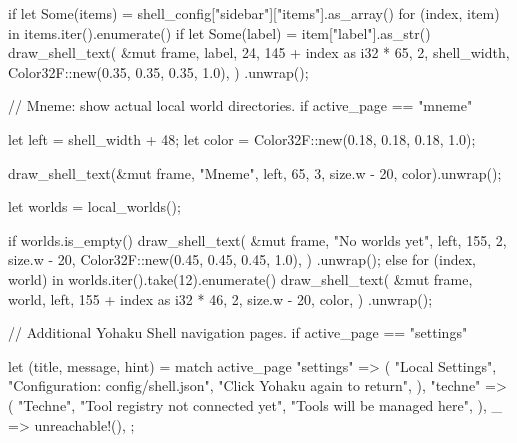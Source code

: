 {{{{                if let Some(items) = shell_config["sidebar"]["items"].as_array() {
                    for (index, item) in items.iter().enumerate() {
                        if let Some(label) = item["label"].as_str() {
                            draw_shell_text(
                                &mut frame,
                                label,
                                24,
                                145 + index as i32 * 65,
                                2,
                                shell_width,
                                Color32F::new(0.35, 0.35, 0.35, 1.0),
                            )
                            .unwrap();
                        }
                    }
                }
            }

            // Mneme: show actual local world directories.
            if active_page == "mneme" {
                let left = shell_width + 48;
                let color = Color32F::new(0.18, 0.18, 0.18, 1.0);

                draw_shell_text(&mut frame, "Mneme", left, 65, 3, size.w - 20, color).unwrap();

                let worlds = local_worlds();

                if worlds.is_empty() {
                    draw_shell_text(
                        &mut frame,
                        "No worlds yet",
                        left,
                        155,
                        2,
                        size.w - 20,
                        Color32F::new(0.45, 0.45, 0.45, 1.0),
                    )
                    .unwrap();
                } else {
                    for (index, world) in worlds.iter().take(12).enumerate() {
                        draw_shell_text(
                            &mut frame,
                            world,
                            left,
                            155 + index as i32 * 46,
                            2,
                            size.w - 20,
                            color,
                        )
                        .unwrap();
                    }
                }
            }

            // Additional Yohaku Shell navigation pages.
            if active_page == "settings" {
                let (title, message, hint) = match active_page {
                    "settings" => (
                        "Local Settings",
                        "Configuration: config/shell.json",
                        "Click Yohaku again to return",
                    ),
                    "techne" => (
                        "Techne",
                        "Tool registry not connected yet",
                        "Tools will be managed here",
                    ),
                    _ => unreachable!(),
                };

}}}}
